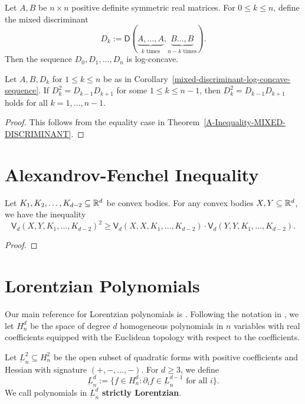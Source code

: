 \documentclass{puthesis-UG}
\begin{document}
\begin{cor} \label{mixed-discriminant-log-concave-sequence}
	Let $A, B$ be $n \times n$ positive definite symmetric real matrices. For $0 \leq k \leq n$, define the mixed discriminant
	\[
		D_k := \mathsf{D} (\underbrace{A, \ldots, A}_{k \text{ times}}, \underbrace{B \ldots, B}_{n-k \text{ times}}).
	\]
	Then the sequence $D_0, D_1, \ldots, D_n$ is log-concave. 
\end{cor}

\begin{cor}
	Let $A, B, D_k$ for $1 \leq k \leq n$ be as in Corollary~\ref{mixed-discriminant-log-concave-sequence}. If $D_k^2 = D_{k-1}D_{k+1}$ for some $1 \leq k \leq n-1$, then $D_k^2 = D_{k-1} D_{k+1}$ holds for all $k = 1, \ldots, n-1$. 
\end{cor}

\begin{proof}
	This follows from the equality case in Theorem~\ref{A-Inequality-MIXED-DISCRIMINANT}. 
\end{proof}
\section{Alexandrov-Fenchel Inequality}

\begin{thm} \label{AF-inequality}
	Let $K_1, K_2, \ldots, K_{d-2} \subseteq \mathbb{R}^d$ be convex bodies. For any convex bodies $X, Y \subseteq \mathbb{R}^d$, we have the inequality
	\[
		\mathsf{V}_d(X, Y, K_1, \ldots, K_{d-2})^2 \geq \mathsf{V}_d(X, X, K_1, \ldots, K_{d-2}) \cdot \mathsf{V}_d(Y, Y, K_1, \ldots, K_{d-2}). 
	\]
\end{thm}

\begin{proof}
	
\end{proof}

\section{Lorentzian Polynomials}

Our main reference for Lorentzian polynomials is \cite{lorentzian-polynomials}. Following the notation in \cite{lorentzian-polynomials}, we let $H_n^d$ be the space of degree $d$ homogeneous polynomials in $n$ variables with real coefficients equipped with the Euclidean topology with respect to the coefficients.  
\begin{defn}
	Let $\underbar{L}_n^2 \subseteq H_n^2$ be the open subset of quadratic forms with positive coefficients and Hessian with signature $(+, -, \ldots, -)$. For $d \geq 3$, we define 
	\[
		\underbar{L}_n^d := \{f \in H_n^d : \partial_i f \in \underbar{L}_n^{d-1} \text{ for all $i$}\}.
	\] 
	We call polynomials in $\underbar{L}_n^d$ \textbf{strictly Lorentzian}.
\end{defn}
\end{document}

